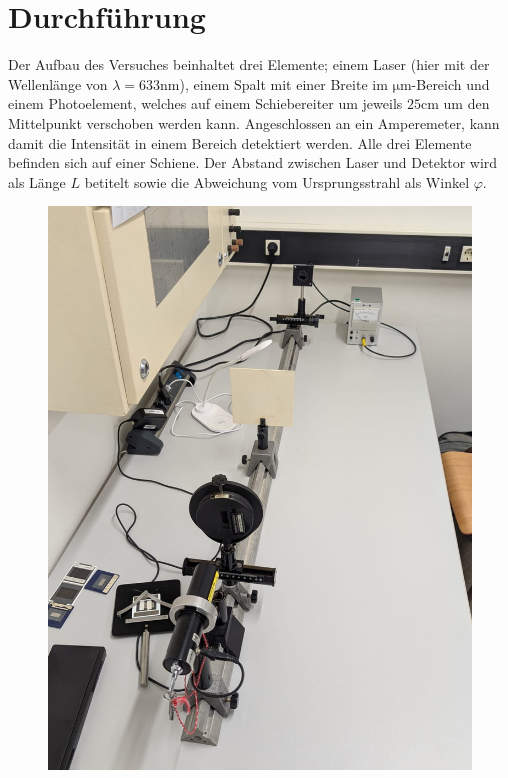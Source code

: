 \section{Durchführung}
\label{sec:Durchführung}

Der Aufbau des Versuches beinhaltet drei Elemente; einem Laser (hier mit der 
Wellenlänge von $\lambda = 633 \unit{\nano\meter}$), einem Spalt mit einer 
Breite im $\unit{\micro\meter}$-Bereich und einem Photoelement, welches auf 
einem Schiebereiter um jeweils $25 \unit{\centi\meter}$ um den Mittelpunkt 
verschoben werden kann. Angeschlossen an ein Amperemeter, kann damit die 
Intensität in einem Bereich detektiert werden. Alle drei Elemente befinden 
sich auf einer Schiene. Der Abstand zwischen Laser und Detektor wird als 
Länge $L$ betitelt sowie die Abweichung vom Ursprungsstrahl als Winkel 
$\varphi$.
\begin{figure}[H]
    \centering
    \begin{minipage}{0.45\textwidth}
        \label{fig:f2}
        \centering
        \includegraphics[width=\textwidth]{Bilder/A1.jpg}

\end{minipage}
\end{figure}
